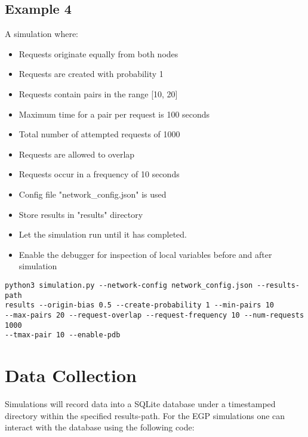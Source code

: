 \documentclass{article}
\begin{document}
\subsection{Example 4}
A simulation where:
\begin{itemize}
    \item Requests originate equally from both nodes
    \item Requests are created with probability 1
    \item Requests contain pairs in the range [10, 20]
    \item Maximum time for a pair per request is 100 seconds
    \item Total number of attempted requests of 1000
    \item Requests are allowed to overlap
    \item Requests occur in a frequency of 10 seconds
    \item Config file "network\_config.json" is used
    \item Store results in "results" directory
    \item Let the simulation run until it has completed.
    \item Enable the debugger for inspection of local variables before and after simulation
\end{itemize}

\begin{verbatim}
python3 simulation.py --network-config network_config.json --results-path
results --origin-bias 0.5 --create-probability 1 --min-pairs 10
--max-pairs 20 --request-overlap --request-frequency 10 --num-requests 1000
--tmax-pair 10 --enable-pdb
\end{verbatim}

\section{Data Collection}
Simulations will record data into a SQLite database under a timestamped directory within the specified results-path.  For the EGP simulations one can interact with the database using the following code:
\end{document}
